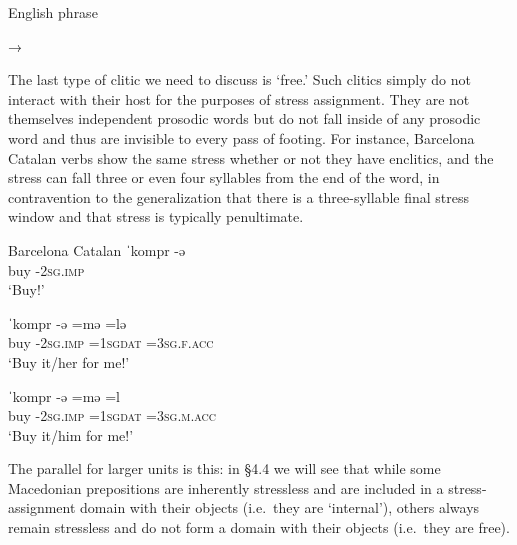 \documentclass[output=paper,
modfonts
]{LSP/langsci}
\begin{document}
\ea English phrase\\
→
\z

The last type of clitic we need to discuss is ‘free.’ Such clitics simply do not interact with their host for the purposes of stress assignment. They are not themselves independent prosodic words but do not fall inside of any prosodic word and thus are invisible to every pass of footing. For instance, Barcelona Catalan verbs \citep{torres-Tamarit2015} show the same stress whether or not they have enclitics, and the stress can fall three or even four syllables from the end of the word, in contravention to the generalization that there is a three-syllable final stress window and that stress is typically penultimate. 

\ea Barcelona Catalan \citep{torres-Tamarit2015}
	\ea \gll ˈkompr \squish-ə\\
	buy \squish-\textsc{2sg.imp}\\
	\glt  `Buy!'
	
	\ex \gll ˈkompr \squish-ə  \squish=mə  \squish=lə\\
	buy \squish\textsc{-2sg.imp} \squish\textsc{=1sgdat} \squish\textsc{=3sg.f.acc}\\
	\glt `Buy it/her for me!'

	\ex \gll ˈkompr \squish-ə  \squish=mə  \squish=l\\
	buy \squish-\textsc{2sg.imp} \squish\textsc{=1sgdat} \squish\textsc{=3sg.m.acc}\\
	\glt `Buy it/him for me!'
	\z
\z

\noindent The parallel for larger units is this: in §4.4 we will see that  while some Macedonian prepositions are inherently stressless and are included in a stress-assignment domain with their objects (i.e.\ they are ‘internal’), others always remain stressless and do not form a domain with their objects (i.e.\ they are free). 
\end{document}

